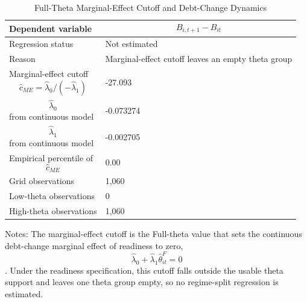 \begin{table}[H]\centering
\begin{threeparttable}
\caption{Full-Theta Marginal-Effect Cutoff and Debt-Change Dynamics}
\label{tab:deltaB_marginal_cutoff_fulltheta}
\scriptsize
\begin{tabularx}{\textwidth}{lY}
\toprule
Dependent variable & $$B_{i,t+1}-B_{it}$$ \\
\midrule
Regression status & Not estimated \\
Reason & Marginal-effect cutoff leaves an empty theta group \\
\midrule
Marginal-effect cutoff $$\widehat{c}_{ME}=\widehat{\lambda}_0/(-\widehat{\lambda}_1)$$ & -27.093 \\
$$\widehat{\lambda}_0$$ from continuous model & -0.073274 \\
$$\widehat{\lambda}_1$$ from continuous model & -0.002705 \\
Empirical percentile of $$\widehat{c}_{ME}$$ & 0.00 \\
Grid observations & 1,060 \\
Low-theta observations & 0 \\
High-theta observations & 1,060 \\
\bottomrule
\end{tabularx}
\begin{tablenotes}[flushleft]\footnotesize
\item Notes: The marginal-effect cutoff is the Full-theta value that sets the continuous debt-change marginal effect of readiness to zero, $$\widehat{\lambda}_0+\widehat{\lambda}_1\widehat{\theta}^{F}_{it}=0$$. Under the readiness specification, this cutoff falls outside the usable theta support and leaves one theta group empty, so no regime-split regression is estimated.
\end{tablenotes}
\end{threeparttable}
\end{table}
